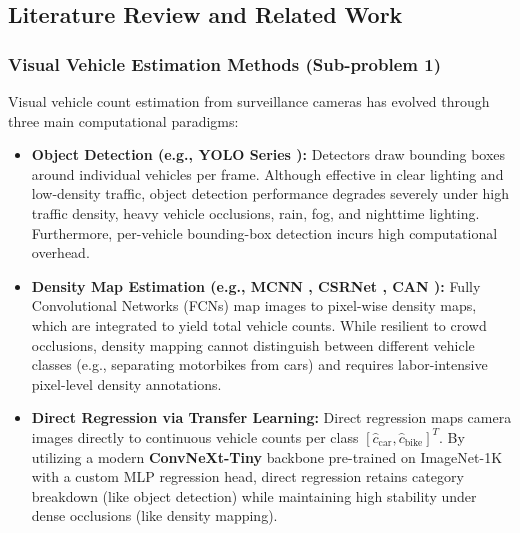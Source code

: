 \subsection{Literature Review and Related Work}

\subsubsection{Visual Vehicle Estimation Methods (Sub-problem 1)}
Visual vehicle count estimation from surveillance cameras has evolved through three main computational paradigms:
\begin{itemize}
    \item \textbf{Object Detection (e.g., YOLO Series \cite{yolo}):} Detectors draw bounding boxes around individual vehicles per frame. Although effective in clear lighting and low-density traffic, object detection performance degrades severely under high traffic density, heavy vehicle occlusions, rain, fog, and nighttime lighting. Furthermore, per-vehicle bounding-box detection incurs high computational overhead.
    \item \textbf{Density Map Estimation (e.g., MCNN \cite{mcnn}, CSRNet \cite{csrnet}, CAN \cite{can}):} Fully Convolutional Networks (FCNs) map images to pixel-wise density maps, which are integrated to yield total vehicle counts. While resilient to crowd occlusions, density mapping cannot distinguish between different vehicle classes (e.g., separating motorbikes from cars) and requires labor-intensive pixel-level density annotations.
    \item \textbf{Direct Regression via Transfer Learning:} Direct regression maps camera images directly to continuous vehicle counts per class $[\hat{c}_{\text{car}}, \hat{c}_{\text{bike}}]^T$. By utilizing a modern \textbf{ConvNeXt-Tiny} backbone \cite{convnext} pre-trained on ImageNet-1K with a custom MLP regression head, direct regression retains category breakdown (like object detection) while maintaining high stability under dense occlusions (like density mapping).
\end{itemize}

